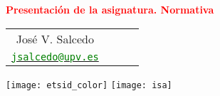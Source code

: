 \begin{frame}[fragile, plain, label = portada]

\titlepage

\begin{center}

\vspace*{-2cm}

\textcolor{red}{\Large\bf Presentación de la asignatura. Normativa}\\[2ex]

\scriptsize
\begin{tabular}{ c c c c}
José V. Salcedo \\
\href{mailto:jsalcedo@upv.es}{\textcolor{green}{\footnotesize\texttt{jsalcedo@upv.es}}}
\end{tabular}

\vspace*{1.0cm}

\texttt{[image: etsid\_color]}
\hspace*{5.5cm}
\texttt{[image: isa]}
\end{center}
\end{frame}